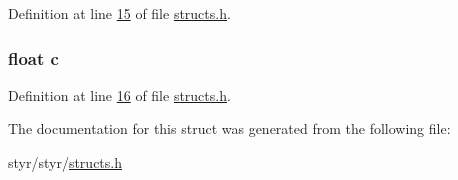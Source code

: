 Definition at line \hyperlink{structs_8h_source_l00015}{15} of file \hyperlink{structs_8h_source}{structs.\+h}.

\subsubsection[{\texorpdfstring{c}{c}}]{\setlength{\rightskip}{0pt plus 5cm}float c}\hypertarget{structtriple__float_ae78103ab33f03590e84ff7bc735629d7}{}\label{structtriple__float_ae78103ab33f03590e84ff7bc735629d7}


Definition at line \hyperlink{structs_8h_source_l00016}{16} of file \hyperlink{structs_8h_source}{structs.\+h}.



The documentation for this struct was generated from the following file\+:\begin{DoxyCompactItemize}
\item 
styr/styr/\hyperlink{structs_8h}{structs.\+h}\end{DoxyCompactItemize}
